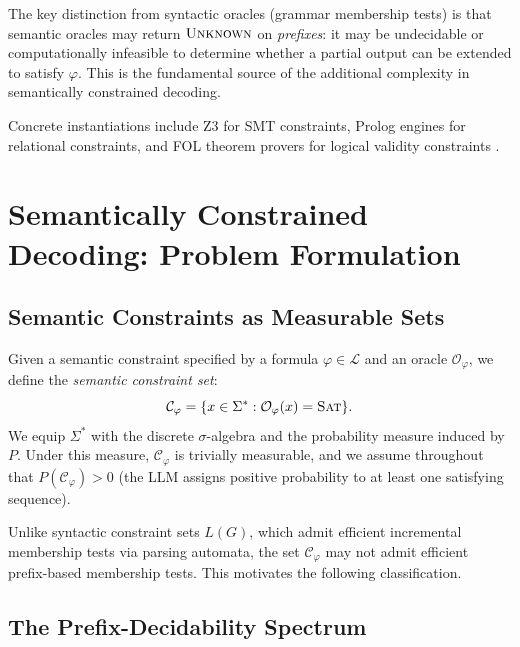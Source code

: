 \documentclass[twoside,11pt]{article}
\newcommand{\Vocab}{\Sigma}
\newcommand{\Oracle}{\mathcal{O}}
\newcommand{\Constraint}{\mathcal{C}}
\newcommand{\Logic}{\mathcal{L}}
\begin{document}
The key distinction from syntactic oracles (grammar membership tests) is
that semantic oracles may return $\textsc{Unknown}$ on \emph{prefixes}: it
may be undecidable or computationally infeasible to determine whether a
partial output can be extended to satisfy $\varphi$. This is the fundamental
source of the additional complexity in semantically constrained decoding.

Concrete instantiations include Z3 \citep{demoura2008z3} for SMT
constraints, Prolog engines for relational constraints, and FOL theorem
provers for logical validity constraints \citep{olausson2023linc}.

\section{Semantically Constrained Decoding: Problem Formulation}
\label{sec:formulation}

\subsection{Semantic Constraints as Measurable Sets}
\label{sec:measurable}

Given a semantic constraint specified by a formula $\varphi \in \Logic$ and
an oracle $\Oracle_\varphi$, we define the \emph{semantic constraint set}:
\begin{equation}
\label{eq:semantic-constraint-set}
\Constraint_\varphi = \{x \in \Vocab^* : \Oracle_\varphi(x) = \textsc{Sat}\}.
\end{equation}
We equip $\Vocab^*$ with the discrete $\sigma$-algebra and the probability
measure induced by $P$. Under this measure, $\Constraint_\varphi$ is
trivially measurable, and we assume throughout that
$P(\Constraint_\varphi) > 0$ (the LLM assigns positive probability to at
least one satisfying sequence).

Unlike syntactic constraint sets $L(G)$, which admit efficient incremental
membership tests via parsing automata, the set $\Constraint_\varphi$ may
not admit efficient prefix-based membership tests. This motivates the
following classification.

\subsection{The Prefix-Decidability Spectrum}
\label{sec:prefix-decidability}
\end{document}
